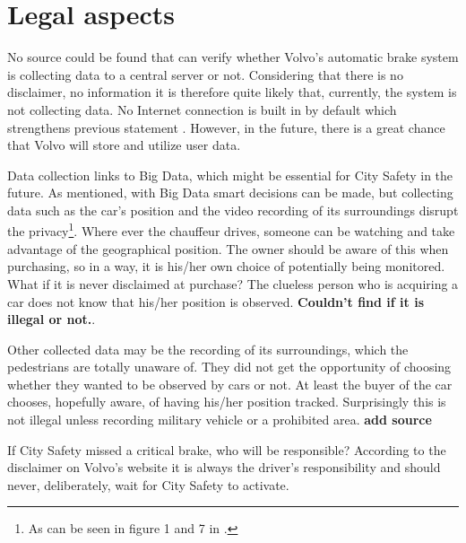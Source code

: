 \documentclass[conference]{IEEEtran}
\begin{document}


\section{Legal aspects}
No source could be found that can verify whether Volvo's automatic brake system is collecting data to a central server or not. Considering that there is no disclaimer, no information it is therefore quite likely that, currently, the system is not collecting data. No Internet connection is built in by default which strengthens previous statement \cite{SensusConnect}. However, in the future, there is a great chance that Volvo will store and utilize user data.

Data collection links to Big Data, which might be essential for City Safety in the future. As mentioned, with Big Data smart decisions can be made, but collecting data such as the car's position and the video recording of its surroundings disrupt the privacy\footnote{As can be seen in figure 1 and 7 in \cite{SysDescription}.}.  Where ever the chauffeur drives, someone can be watching and take advantage of the geographical position. The owner should be aware of this when purchasing, so in a way, it is his/her own choice of potentially being monitored. What if it is never disclaimed at purchase? The clueless person who is acquiring a car does not know that his/her position is observed. \textbf{Couldn't find if it is illegal or not.}.

Other collected data may be the recording of its surroundings, which the pedestrians are totally unaware of. They did not get the opportunity of choosing whether they wanted to be observed by cars or not. At least the buyer of the car chooses, hopefully aware, of having his/her position tracked. Surprisingly this is not illegal unless recording military vehicle or a prohibited area. \textbf{add source}

If City Safety missed a critical brake, who will be responsible? According to the disclaimer on Volvo's website it is always the driver's responsibility and should never, deliberately, wait for City Safety to activate. \cite{CitySafetyLegal}
\end{document}

